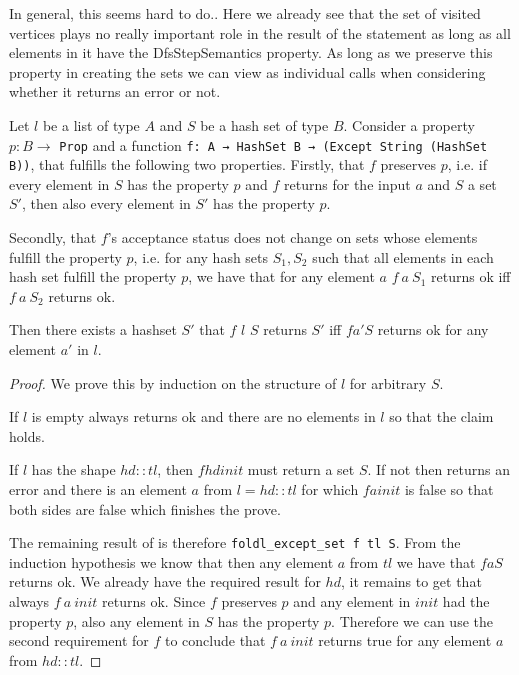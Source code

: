 In general, this seems hard to do..
Here we already see that the set of visited vertices plays no really important role in the result of the statement as long as all elements in it have the DfsStepSemantics property. As long as we preserve this property in creating the sets we can view \foldlexceptset as individual calls when considering whether it returns an error or not.

\begin{lemma}[\foldlexceptsetisok]
  Let $l$ be a list of type $A$ and $S$ be a hash set of type $B$. Consider a property $p: B \to$ \lstinline|Prop| and a function \lstinline|f: A → HashSet B → (Except String (HashSet B))|, that fulfills the following two properties.
  Firstly, that $f$ preserves $p$, i.e. if every element in $S$ has the property $p$ and $f$ returns for the input $a$ and $S$ a set $S'$, then also every element in $S'$ has the property $p$.

  Secondly, that $f$'s acceptance status does not change on sets whose elements fulfill the property $p$, i.e. for any hash sets $S_1, S_2$ such that all elements in each hash set fulfill the property $p$, we have that for any element $a$ $f\ a\ S_1$ returns ok iff $f\ a\ S_2$ returns ok.
  
  Then there exists a hashset $S'$ that \foldlexceptset $f$ $l$ $S$ returns $S'$ iff $f a' S$ returns ok for any element $a'$ in $l$.
\end{lemma}
\begin{proof}
  We prove this by induction on the structure of $l$ for arbitrary $S$.

  If $l$ is empty \foldlexceptset always returns ok and there are no elements in $l$ so that the claim holds.

  If $l$ has the shape $hd::tl$, then $f hd init$ must return a set $S$. If not then \foldlexceptset returns an error and there is an element $a$ from $l=hd::tl$ for which $f a init$ is false so that both sides are false which finishes the prove.

  The remaining result of \foldlexceptset is therefore \lstinline|foldl_except_set f tl S|. From the induction hypothesis we know that then any element $a$ from $tl$ we have that $f a S$ returns ok. We already have the required result for $hd$, it remains to get that always $f\ a\ init$ returns ok. Since $f$ preserves $p$ and any element in $init$ had the property $p$, also any element in $S$ has the property $p$. Therefore we can use the second requirement for $f$ to conclude that  $f\ a\ init$ returns true for any element $a$ from $hd::tl$.
\end{proof}

